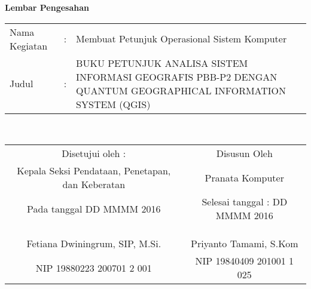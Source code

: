\begin{center}
{\huge \bfseries Lembar Pengesahan}\\[0.4cm]



\begin{tabular}{l c p{10cm}}
  Nama Kegiatan & : & Membuat Petunjuk Operasional Sistem Komputer \\
  Judul & : & BUKU PETUNJUK ANALISA SISTEM INFORMASI GEOGRAFIS PBB-P2 DENGAN QUANTUM GEOGRAPHICAL INFORMATION SYSTEM (QGIS) \\
\end{tabular}\\[2cm]

\begin{tabular}{c c}
  Disetujui oleh : & Disusun Oleh \\
  Kepala Seksi Pendataan, Penetapan, dan Keberatan & Pranata Komputer \\
  Pada tanggal DD MMMM 2016 & Selesai tanggal : DD MMMM 2016 \\
  & \\
  & \\
  & \\
  Fetiana Dwiningrum, SIP, M.Si. & Priyanto Tamami, S.Kom \\
  NIP 19880223 200701 2 001 & NIP 19840409 201001 1 025
\end{tabular}

\end{center}